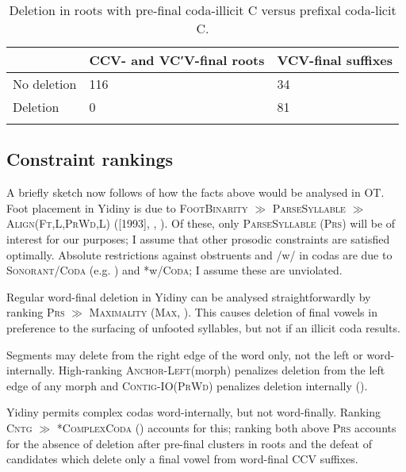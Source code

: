 \documentclass[output=paper,
modfonts
]{LSP/langsci}
\begin{document}
 \begin{table}
\caption{Deletion in roots with pre-final coda-illicit C versus prefixal coda-licit C.}
\begin{tabular}{lll}
\lsptoprule
 & \textbf{CCV- and VCʹV-final roots} & \textbf{VCV-final suffixes} \\
 \midrule
 No deletion & 116 & 34 \\
 Deletion & 0 & 81 \\
 \lspbottomrule
 \end{tabular}
 \end{table}
 
\subsection[Constraint rankings]{Constraint rankings}

A briefly sketch now follows of how the facts above would be analysed in OT. Foot placement in Yidiny is due to \textsc{FootBinarity} \textsc{${\gg}$} \textsc{ParseSyllable} \textsc{${\gg}$} \\
 \textsc{Align(Ft,L,PrWd,L)}  (\citealt{princesmolensky2004}[1993], \citealt{mccarthy1993}, \citealt{mccarthy1995r}). Of these, only \textsc{ParseSyllable (Prs)} will be of\textsc{} interest for our purposes; I assume that other prosodic constraints are satisfied optimally. Absolute restrictions against obstruents and /w/ in codas are due to \textsc{Sonorant/Coda} (e.g. \citealt{lombardi2002}) and *w/\textsc{Coda}; I assume these are unviolated.

Regular word-final deletion in Yidiny can be analysed straightforwardly by ranking \textsc{Prs} \textsc{${\gg}$} \textsc{Maximality (Max,} \citealt{mccarthy1995r}). This causes deletion of final vowels in preference to the surfacing of unfooted syllables, but not if an illicit coda results.

Segments may delete from the right edge of the word only, not the left or word-internally. High-ranking \textsc{Anchor-Left(}morph\textsc{)} penalizes deletion from the left edge of any morph and \textsc{Contig-IO(PrWd)} penalizes deletion internally (\citealt{mccarthy1995r}).

Yidiny permits complex codas word-internally, but not word-finally. Ranking \textsc{Cntg} ${\gg}$ *\textsc{ComplexCoda} (\citealt{bernhardt1998}) accounts for this; ranking both above \textsc{Prs} accounts for the absence of deletion after pre-final clusters in roots and the defeat of candidates which delete only a final vowel from word-final CCV suffixes.
\end{document}
